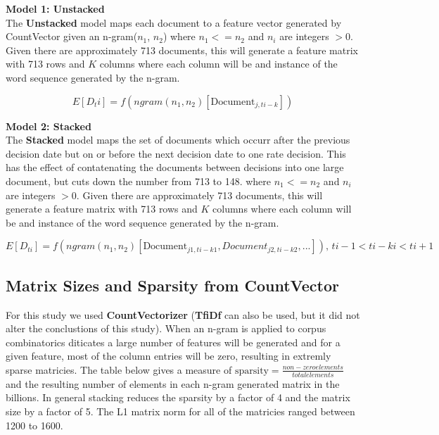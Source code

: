 \documentclass[11pt]{article}
\begin{document}
{\noindent 
\textbf{Model 1: Unstacked}\\
\noindent
The \textbf{Unstacked} model maps each document to a feature vector generated by CountVector given an n-gram($n_1$, $n_2$)
where $n_1 <= n_2$ and $n_i$ are integers $>0$. Given there are approximately 713 documents, this will generate
a feature matrix with 713 rows and $K$ columns where each column will be and instance of the word sequence
generated by the n-gram.

\begin{equation*}
E[D_ti] = f(ngram(n_1, n_2)[\mbox{Document}_{j,ti-k}])
\end{equation*}

\noindent
\textbf{Model 2: Stacked}\\
The \textbf{Stacked}  model maps the set of documents which occurr after the previous decision date but on or before the
next decision date to one rate decision.  This has the effect of contatenating the documents between decisions into
one large document, but cuts down the number from 713 to 148.
where $n_1 <= n_2$ and $n_i$ are integers $>0$. Given there are approximately 713 documents, this will generate
a feature matrix with 713 rows and $K$ columns where each column will be and instance of the word sequence
generated by the n-gram.

\begin{equation*}
E[D_{ti}] = f(ngram(n_1, n_2)[\mbox{Document}_{j1,ti-k1},{Document}_{j2,ti-k2},...]) \text{, } ti-1 < ti-ki < ti+1
\end{equation*}

\subsection{Matrix Sizes and Sparsity from CountVector}

\noindent For this study we used \textbf{CountVectorizer} (\textbf{TfiDf} can also be used, but it did not alter the conclustions of this study).
When an n-gram is applied to corpus combinatorics diticates a large number of features will be generated and for a given feature, most of the column entries will
be zero, resulting in extremly sparse matricies.  The table below gives a measure of $\mbox{sparsity} = \frac{non-zero elements}{total elements}$ and 
the resulting number of elements in each n-gram generated matrix in the billions. In general stacking reduces the sparsity by a factor of 4 and
the matrix size by a factor of 5. The L1 matrix norm for all of the matricies ranged between 1200 to 1600.\\

}
\end{document}
